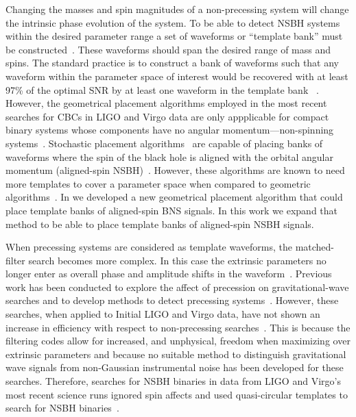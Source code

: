 Changing the masses and spin magnitudes of a non-precessing system will change
the intrinsic phase evolution of the system. To be able to detect \ac{NSBH}
systems within the desired parameter range a set of waveforms or ``template
bank'' must be
constructed~\cite{Sathyaprakash:1991mt,Poisson:1995ef,Owen:1995tm,Owen:1998dk,
Babak:2006ty,Balasubramanian:1995bm,Cokelaer:2007kx}. These waveforms should
span the desired range of mass and spins.
The standard practice is to construct a bank of waveforms such that any
waveform within the parameter space of interest would be recovered with at
least 97\% of the optimal \ac{SNR} by at least one waveform in the template
bank~\cite{Babak:2006ty,Babak:2012zx} . However, the geometrical
placement algorithms employed in the most recent searches for \acp{CBC} in 
LIGO and Virgo data are only appplicable for compact binary systems whose 
components have no angular momentum---non-spinning 
systems~\cite{Abbott:2009tt,Abbott:2009qj,Abadie:2010yba,Abadie:2011nz}. 
Stochastic
placement algorithms~\cite{Babak:2008rb,Harry:2009ea,Manca:2009xw,Ajith:2012mn}
are capable of placing banks of waveforms where the spin of the
black hole is aligned with the orbital angular momentum (aligned-spin
\ac{NSBH})~\cite{Ajith:2012mn}. However,
these algorithms are known to need more templates to cover a parameter space
when compared to geometric algorithms~\cite{Harry:2009ea}. In 
\cite{Brown:2012qf} we developed a new geometrical placement algorithm that 
could place template banks of aligned-spin \ac{BNS} signals. In this work we 
expand that method to be able to place template banks of aligned-spin \ac{NSBH} 
signals.

When precessing systems are considered as template waveforms, the matched-filter
search becomes more complex. In this case the extrinsic parameters no longer
enter as overall phase and amplitude shifts in the
waveform~\cite{Apostolatos:1994mx}. Previous work has been conducted to explore
the affect of precession on gravitational-wave searches and to develop methods
to detect precessing
systems~\cite{Apostolatos:1996rf,Buonanno:2002fy,Grandclement:2002dv,
Grandclement:2002vx,Grandclement:2003ck,Pan:2003qt,Buonanno:2004yd,
Buonanno:2005pt, Abbott:2007ai,VanDenBroeck:2009gd,Fazi:2009,Harry:2011qh,
Ajith:2012mn, Brown:2012gs,Lundgren:2013jla}. However, these searches, when
applied to Initial LIGO and Virgo data, have not shown an increase in efficiency
with respect to non-precessing searches~\cite{VanDenBroeck:2009gd}. This is
because the filtering codes allow for increased, and unphysical, freedom when
maximizing over extrinsic parameters and because no suitable method to
distinguish gravitational wave signals from non-Gaussian instrumental noise has
been developed for these searches. Therefore, searches for \ac{NSBH} binaries
in data from LIGO and Virgo's most recent science runs ignored spin affects and
used quasi-circular templates to search for \ac{NSBH}
binaries~\cite{Abbott:2009tt,Abbott:2009qj,Abadie:2010yba,Abadie:2011nz}.

